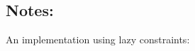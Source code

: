 \newpage

\subsection*{Notes:}



\newpage
\begin{bclogo}[logo=\bcinfo]{\small An implementation using lazy constraints:}
\vspace{.2cm} \tiny




\vspace{.2cm}
\end{bclogo}

\newpage

     

